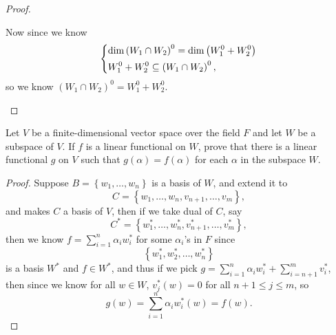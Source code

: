 \begin{proof}
\begin{itemize}
        Now since we know 
        \[
            \begin{dcases}
                \dim \left( W_1 \cap W_2 \right)^0 = \dim \left( W_1^0 + W_2^0 \right) \\
                W_1^0 + W_2^0 \subseteq \left( W_1 \cap W_2 \right)^0,   
            \end{dcases}
        \]so we know \(\left( W_1 \cap W_2 \right)^0 = W_1^0 + W_2^0 \). 
    \end{itemize}
\end{proof}

\begin{problem}
    Let \(V\) be a finite-dimensional vector space over the field \(F\) and let \(W\) be a subspace of \(V\). If \(f\) is a linear functional on \(W\), prove that there is a linear functional \(g\) on \(V\) such that \(g(\alpha ) = f(\alpha )\) for each \(\alpha \) in the subspace \(W\).           
\end{problem}
\begin{proof}
    Suppose \(B = \left\{ w_1, \dots , w_n \right\} \) is a basis of \(W\), and extend it to 
    \[
        C = \left\{ w_1, \dots , w_n, v_{n+1}, \dots , v_m \right\}, 
    \] and makes \(C\) a basis of \(V\), then if we take dual of \(C\), say 
    \[
        C^* = \left\{ w_1^*, \dots , w_n^*, v_{n+1}^*, \dots , v_m^* \right\}, 
    \] then we know \(f = \sum_{i=1}^n \alpha _i w_i^* \) for some \(\alpha _i\)'s in \(F\) since 
    \[
        \left\{ w_1^*, w_2^*, \dots , w_n^* \right\} 
    \] is a basis \(W^*\) and \(f \in W^*\), and thus if we pick \(g = \sum_{i=1}^n \alpha _i w_i^* + \sum_{i=n+1}^m v_i^*   \), then since we know for all \(w \in W\), \(v_j^*(w) = 0\) for all \(n + 1 \le j \le m\), so 
    \[
        g(w) = \sum_{i=1}^n \alpha _i w_i^*(w) = f(w). 
    \]      
\end{proof}

